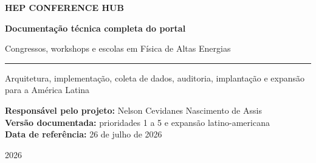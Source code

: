 \documentclass[
  12pt,
  oneside,
  a4paper,
  chapter=TITLE,
  section=TITLE,
  brazil
]{abntex2}
\begin{document}
\frenchspacing

\begin{titlingpage}
\centering
\vspace*{1.5cm}
{\Large\bfseries HEP CONFERENCE HUB\par}
\vspace{1.1cm}
{\huge\bfseries Documentação técnica completa do portal\par}
\vspace{0.45cm}
{\Large Congressos, workshops e escolas em Física de Altas Energias\par}
\vspace{1.2cm}
\rule{0.82\textwidth}{0.6pt}\par
\vspace{0.8cm}
{\large Arquitetura, implementação, coleta de dados, auditoria, implantação e expansão para a América Latina\par}
\vfill
\begin{flushleft}
\textbf{Responsável pelo projeto:} Nelson Cevidanes Nascimento de Assis\\[0.35cm]
\textbf{Versão documentada:} prioridades 1 a 5 e expansão latino-americana\\[0.35cm]
\textbf{Data de referência:} 26 de julho de 2026
\end{flushleft}
\vspace{1.2cm}
{\large 2026\par}
\end{titlingpage}

\pretextual

\tableofcontents*
\cleardoublepage
\listoffigures*
\cleardoublepage

\textual




















\postextual
\appendix
\partapendices




\end{document}
